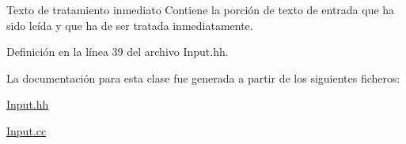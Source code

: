 Texto de tratamiento inmediato Contiene la porción de texto de entrada que ha sido leída y que ha de ser tratada inmediatamente. 



Definición en la línea 39 del archivo Input.\+hh.



La documentación para esta clase fue generada a partir de los siguientes ficheros\+:\begin{DoxyCompactItemize}
\item 
\hyperlink{_input_8hh}{Input.\+hh}\item 
\hyperlink{_input_8cc}{Input.\+cc}\end{DoxyCompactItemize}
